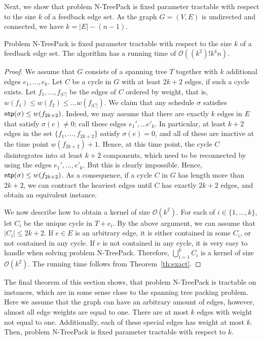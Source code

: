 \documentclass[runningheads]{llncs}
\newcommand{\set}[1]{\{ #1 \}}
\newcommand{\fromto}[2]{\set{#1, \ldots, #2}}
\newcommand{\bigO}{\mathcal{O}}
\DeclareMathOperator{\ntp}{\text{\sf ntp}}
\newcommand{\xxxNTP}{{\sc N-TreePack}}
\begin{document}
Next, we show that problem {\xxxNTP} is fixed parameter tractable with respect to the size $k$ 
of a feedback edge set. 
As the graph $G=(V,E)$ is undirected and connected, we have $k=|E|-(n-1)$.

\begin{theorem}
\label{thm:FPT_feedback_edge_set}
Problem {\xxxNTP} is fixed parameter tractable with respect to the size $k$ of a feedback edge set. 
The algorithm has a running time of $\bigO((k^2)!k^4n)$. 
\end{theorem}

\begin{proof}
We assume that $G$ consists of a spanning tree $T$ together with $k$ additional edges $e_1,\ldots,e_k$. 
Let $C$ be a cycle in $G$ with at least $2k+2$ edges, if such a cycle exists. 
Let $f_1,\ldots,f_{|C|}$ be the edges of $C$ ordered by weight, that is, $w(f_1) \leq w(f_2) \leq \dots w(f_{|C|})$. 
We claim that any schedule $\sigma$ satisfies $\ntp(\sigma)\le w(f_{2k+2})$. 
Indeed, we may assume that there are exactly $k$ edges in $E$ that satisfy $\sigma(e)\ne0$; 
call these edges $e_1', \dots e'_k$. 
In particular, at least $k+2$ edges in the set $\fromto{f_1}{f_{2k+2}}$ satisfy $\sigma(e)=0$, 
and all of these are inactive at the time point $w(f_{2k+2}) + 1$. 
Hence, at this time point, the cycle $C$ disintegrates into at least $k+2$ components, which need 
to be reconnected by using the edges $e_1', \dots, e'_k$. But this is clearly impossible. 
Hence, $\ntp(\sigma) \leq w(f_{2k+2})$. 
As a consequence, if a cycle $C$ in $G$ has length more than $2k+2$, we can contract the heaviest 
edges until $C$ has exactly $2k+2$ edges, and obtain an equivalent instance.

We now describe how to obtain a kernel of size $\bigO(k^2)$. For each of $i \in \fromto{1}{k}$, let $C_i$ be the unique cycle in $T + e_i$. By the above argument, we can assume that $|C_i| \leq 2k+2$. If $e \in E$ is an arbitrary edge, it is either contained in some $C_i$, or not contained in any cycle. If $e$ is not contained in any cycle, it is very easy to handle when solving problem {\xxxNTP}. Therefore, $\bigcup_{i=1}^k C_i$ is a kernel of size $\bigO(k^2)$. The running time follows from Theorem~\ref{th:exact}.
\end{proof}

The final theorem of this section shows, that problem {\xxxNTP} is tractable on instances, which are in some sense close to the spanning tree packing problem. Here we assume that the graph can have an arbitrary amount of edges, however, almost all edge weights are equal to one. There are at most $k$ edges with weight not equal to one. Additionally, each of these special edges has weight at most $k$. Then, problem {\xxxNTP} is fixed parameter tractable with respect to $k$.
\end{document}
